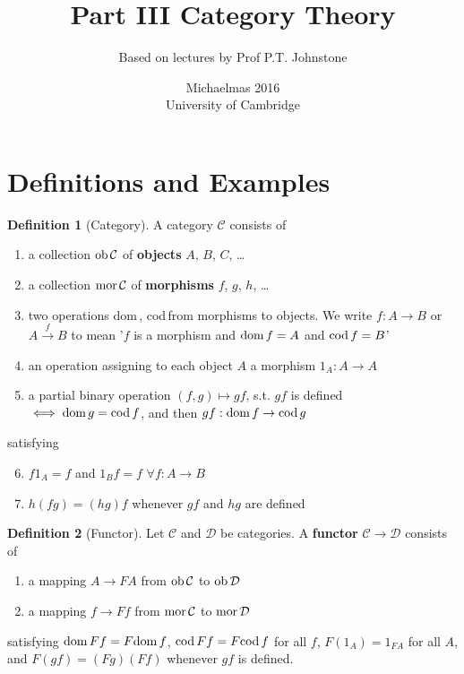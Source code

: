 \documentclass[a4paper]{article}
\title{Part III Category Theory}
\author{Based on lectures by Prof P.T. Johnstone}
\date{Michaelmas 2016\\University of Cambridge}
\theoremstyle{definition}
\newtheorem{definition}{Definition}
\theoremstyle{remark}
\theoremstyle{default}
\numberwithin{definition}{section}
\newcommand*\dom[1]{\textnormal{dom}\,#1}
\newcommand*\cod[1]{\textnormal{cod}\,#1}
\newcommand*\ob[1]{\textnormal{ob}\,#1}
\newcommand*\mor[1]{\textnormal{mor}\,#1}
\begin{document}
\maketitle
\tableofcontents

\section{Definitions and Examples}
\begin{definition}[Category]
	A category $\mathcal{C}$ consists of 
	\begin{enumerate}[label=\alph*.]
		\item a collection $\ob{\mathcal{C}}$ of \textbf{objects} $A$, $B$, $C$, \dots
		\item a collection $\mor{\mathcal{C}}$ of \textbf{morphisms} $f$, $g$, $h$, \dots
		\item two operations \dom, \cod from morphisms to objects. We write $f:A\to B$ or $A\overset{f}{\to}B$ to mean '$f$ is a morphism and $\dom{f}=A$ and $\cod{f}=B$'
		\item an operation assigning to each object $A$ a morphism $1_A:A\to A$
		\item a partial binary operation $(f, g) \mapsto gf$, s.t. $gf$ is defined $\iff \dom{g}=\cod{f}$, and then $gf:\dom{f}\to\cod{g}$
	\end{enumerate}
	satisfying
	\begin{enumerate}[label=\alph*.]
		\setcounter{enumi}{5}
		\item $f 1_A = f$ and $1_B f=f$ $\forall f: A \to B$
		\item $h(fg) = (hg)f$ whenever $gf$ and $hg$ are defined
	\end{enumerate}
\end{definition}

\begin{definition}[Functor]
	Let $\mathcal{C}$ and $\mathcal{D}$ be categories. A \textbf{functor} $\mathcal{C}\to\mathcal{D}$ consists of
	\begin{enumerate}[label=\alph*.]
		\item a mapping $A \to FA$ from $\ob{\mathcal{C}}$ to $\ob{\mathcal{D}}$
		\item a mapping $f \to Ff$ from $\mor{\mathcal{C}}$ to $\mor{\mathcal{D}}$
	\end{enumerate}
	satisfying $\dom{Ff}=F\dom{f}$, $\cod{Ff}=F\cod{f}$ for all $f$, $F(1_A)=1_{FA}$ for all $A$, and $F(gf)=(Fg)(Ff)$ whenever $gf$ is defined.
\end{definition}
\end{document}

